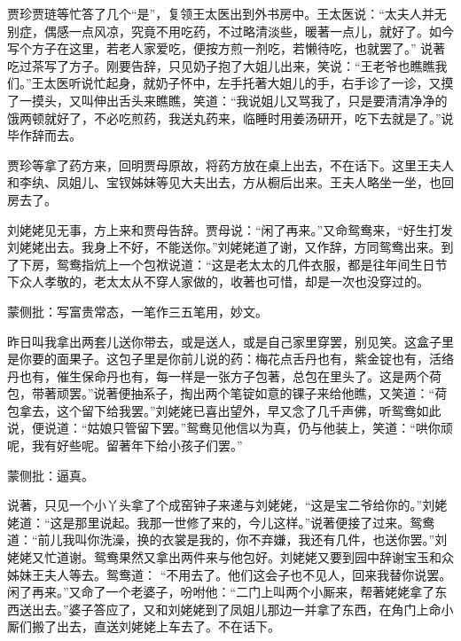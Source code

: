 \begin{parag}


    贾珍贾琏等忙答了几个“是”，复领王太医出到外书房中。王太医说：“太夫人并无别症，偶感一点风凉，究竟不用吃药，不过略清淡些，暖著一点儿，就好了。如今写个方子在这里，若老人家爱吃，便按方煎一剂吃，若懒待吃，也就罢了。” 说著吃过茶写了方子。刚要告辞，只见奶子抱了大姐儿出来，笑说：“王老爷也瞧瞧我们。”王太医听说忙起身，就奶子怀中，左手托著大姐儿的手，右手诊了一诊，又摸了一摸头，又叫伸出舌头来瞧瞧，笑道：“我说姐儿又骂我了，只是要清清净净的饿两顿就好了，不必吃煎药，我送丸药来，临睡时用姜汤研开，吃下去就是了。”说毕作辞而去。
\end{parag}


\begin{parag}


    贾珍等拿了药方来，回明贾母原故，将药方放在桌上出去，不在话下。这里王夫人和李纨、凤姐儿、宝钗姊妹等见大夫出去，方从橱后出来。王夫人略坐一坐，也回房去了。
\end{parag}


\begin{parag}


    刘姥姥见无事，方上来和贾母告辞。贾母说：“闲了再来。”又命鸳鸯来，“好生打发刘姥姥出去。我身上不好，不能送你。”刘姥姥道了谢，又作辞，方同鸳鸯出来。到了下房，鸳鸯指炕上一个包袱说道：“这是老太太的几件衣服，都是往年间生日节下众人孝敬的，老太太从不穿人家做的，收著也可惜，却是一次也没穿过的。\begin{note}蒙侧批：写富贵常态，一笔作三五笔用，妙文。\end{note}昨日叫我拿出两套儿送你带去，或是送人，或是自己家里穿罢，别见笑。这盒子里是你要的面果子。这包子里是你前儿说的药：梅花点舌丹也有，紫金锭也有，活络丹也有，催生保命丹也有，每一样是一张方子包著，总包在里头了。这是两个荷包，带著顽罢。”说著便抽系子，掏出两个笔锭如意的锞子来给他瞧，又笑道：“荷包拿去，这个留下给我罢。”刘姥姥已喜出望外，早又念了几千声佛，听鸳鸯如此说，便说道：“姑娘只管留下罢。”鸳鸯见他信以为真，仍与他装上，笑道：“哄你顽呢，我有好些呢。留著年下给小孩子们罢。”\begin{note}蒙侧批：逼真。\end{note}说著，只见一个小丫头拿了个成窑钟子来递与刘姥姥，“这是宝二爷给你的。”刘姥姥道：“这是那里说起。我那一世修了来的，今儿这样。”说著便接了过来。鸳鸯道：“前儿我叫你洗澡，换的衣裳是我的，你不弃嫌，我还有几件，也送你罢。”刘姥姥又忙道谢。鸳鸯果然又拿出两件来与他包好。刘姥姥又要到园中辞谢宝玉和众姊妹王夫人等去。鸳鸯道： “不用去了。他们这会子也不见人，回来我替你说罢。闲了再来。”又命了一个老婆子，吩咐他：“二门上叫两个小厮来，帮著姥姥拿了东西送出去。”婆子答应了，又和刘姥姥到了凤姐儿那边一并拿了东西，在角门上命小厮们搬了出去，直送刘姥姥上车去了。不在话下。
\end{parag}


